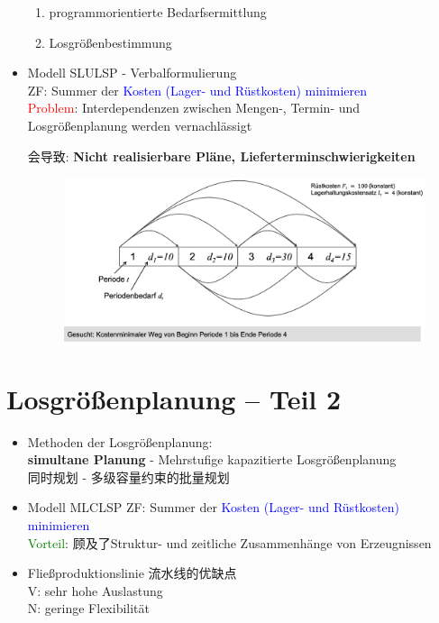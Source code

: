 \documentclass[12pt, letterpaper]{article}
\begin{document}
\begin{CJK*}{UTF8}{gbsn}
\begin{itemize}
\begin{enumerate}
\item programmorientierte Bedarfsermittlung
\item Losgrößenbestimmung
\end{enumerate}

\item Modell SLULSP - Verbalformulierung\\[1mm]
ZF: Summer der \textcolor{blue}{Kosten (Lager- und Rüstkosten) minimieren}\\[1mm]
\textcolor{red}{Problem}: Interdependenzen zwischen Mengen-, Termin- und Losgrößenplanung werden vernachlässigt

会导致: \textbf{Nicht realisierbare Pläne, Lieferterminschwierigkeiten}


\begin{figure}[h!]
  \centering %
  \includegraphics[width=0.9\linewidth]{VL81.png}
\end{figure}
\end{itemize}

\newpage
\section{Losgrößenplanung – Teil 2}
\begin{itemize}
\item Methoden der Losgrößenplanung:\\[1mm]
\textbf{simultane Planung} - Mehrstufige kapazitierte Losgrößenplanung\\
同时规划 - 多级容量约束的批量规划

\item Modell MLCLSP
ZF: Summer der \textcolor{blue}{Kosten (Lager- und Rüstkosten) minimieren}\\[1mm]
\textcolor{green}{Vorteil}: 顾及了Struktur- und zeitliche Zusammenhänge von Erzeugnissen

\item Fließproduktionslinie 流水线的优缺点\\[1mm]
V: sehr hohe Auslastung\\[1mm]
N: geringe Flexibilität

\end{itemize}



\end{CJK*}
\end{document}
